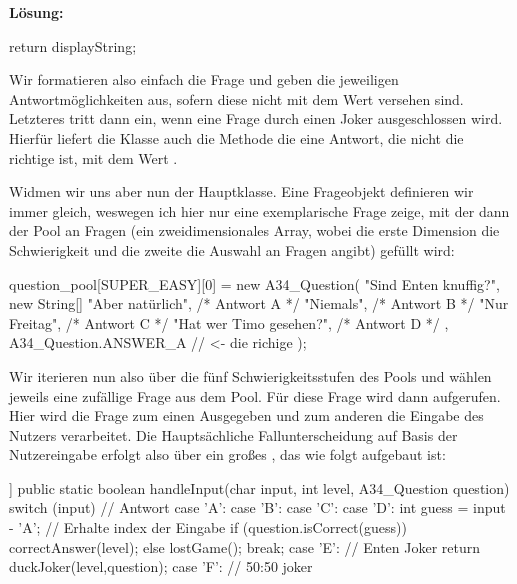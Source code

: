 \documentclass[table]{sopra-base}
\makeatletter
\newenvironment{solution}{\null\par\noindent\textbf{\textcolor{sob@col@uulm@cs}{Lösung:}}\newline\bgroup\color{black}\slshape\ignorespaces}{\egroup}
\makeatother
\begin{document}
\begin{solution}
{\begin{java}[firstnumber=96]
{    return displayString;
}
\end{java}
}
    Wir formatieren also einfach die Frage und geben die jeweiligen Antwortmöglichkeiten aus, sofern diese nicht mit dem Wert  versehen sind. Letzteres tritt dann ein, wenn eine Frage durch einen Joker ausgeschlossen wird. Hierfür liefert die Klasse auch die Methode  die eine Antwort, die nicht die richtige ist, mit dem Wert .\par{}
    Widmen wir uns aber nun der Hauptklasse. Eine Frageobjekt definieren wir immer gleich, weswegen ich
    hier nur eine exemplarische Frage zeige, mit der dann der Pool an Fragen (ein zweidimensionales Array, wobei die erste Dimension die Schwierigkeit und die zweite die Auswahl an Fragen angibt) gefüllt wird:
{\upshape
\begin{java*}[morekeywords={[4]{SUPER\_EASY,ANSWER\_A}},add to literate={A34_Question}{{\solGet{keywordC}{A34\_Question}}}{11}]
question_pool[SUPER_EASY][0] = new A34_Question(
    "Sind Enten knuffig?", 
    new String[] {
        "Aber natürlich",        /* Antwort A */
        "Niemals",               /* Antwort B */
        "Nur Freitag",           /* Antwort C */
        "Hat wer Timo gesehen?", /* Antwort D */
    }, A34_Question.ANSWER_A // <- die richige
);
\end{java*}
}
    Wir iterieren nun also über die fünf Schwierigkeitsstufen des Pools und wählen jeweils eine
    zufällige Frage aus dem Pool. Für diese Frage wird dann  aufgerufen. Hier wird die Frage zum einen Ausgegeben und zum anderen die Eingabe des Nutzers verarbeitet. Die Hauptsächliche Fallunterscheidung auf Basis der Nutzereingabe erfolgt also über ein großes , das wie folgt aufgebaut ist:
{\upshape
\begin{java}[firstnumber=106,add to literate={A34_Question}{{\solGet{keywordC}{A34\_Question}}}{11}]]
public static boolean handleInput(char input, int level, 
                                  A34_Question question) {
    switch (input) {
        // Antwort
        case 'A': case 'B':
        case 'C': case 'D':
            int guess = input - 'A'; // Erhalte index der Eingabe
            if (question.isCorrect(guess)) {
                correctAnswer(level);
            } else {
                lostGame();
            }
            break;
        case 'E': // Enten Joker
            return duckJoker(level,question);
        case 'F': // 50:50 joker
}}
\end{java}}
\end{solution}
\end{document}
